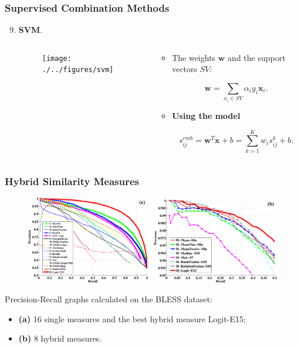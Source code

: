 \begin{frame}
\frametitle{Supervised Combination Methods}

\begin{enumerate}
  \setcounter{enumi}{8}
\item \textbf{SVM}. 


\begin{columns}
  \begin{column}{0.5\textwidth}
\begin{figure}
\centering
\texttt{[image: ./../figures/svm]}
\end{figure}
    
  \end{column}

  \begin{column}{0.5\textwidth}
\begin{itemize}
\item The weights $\mathbf{w}$ and the support vectors $SV$: 

$$
\mathbf{w} = \sum_{x_i \in SV} \alpha_i y_i \mathbf{x}_i.  
$$

\item \textbf{Using the model} 

$$
s_{ij}^{cmb} = \mathbf{w}^T\mathbf{x} + b = \sum_{k=1}^K w_i s_{ij}^k + b.
$$

\end{itemize}    
  \end{column}
\end{columns}





\end{enumerate}

\end{frame}






\begin{frame}
\frametitle{Hybrid Similarity Measures}
\begin{figure}
\centering
\includegraphics[width=1.0\textwidth]{figures/pr}

\end{figure}

Precision-Recall graphs calculated on the BLESS dataset:
\begin{itemize}
  \item \textbf{(a)} 16 single measures and the best hybrid measure Logit-E15;
  \item \textbf{(b)} 8 hybrid measures.
\end{itemize}

\end{frame}



